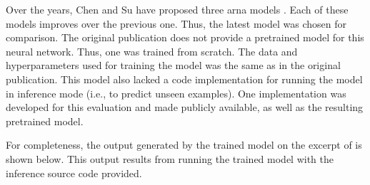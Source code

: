 
Over the years, Chen and Su have proposed three \gls{arna}
models \parencite{chen2018functional, chen2019harmony,
chen2021attend}. Each of these models improves over the
previous one. Thus, the latest model
\parencite{chen2021attend} was chosen for comparison. The
original publication does not provide a pretrained model
for this neural network. Thus, one was trained from scratch.
The data and hyperparameters used for training the model was
the same as in the original publication. This model also
lacked a code implementation for running the model in
inference mode (i.e., to predict unseen examples). One
implementation was developed for this evaluation and made
publicly available, as well as the resulting pretrained
model.

For completeness, the output generated by the trained model
on the excerpt of  is shown below. This
output results from running the trained model with the
inference source code provided.


